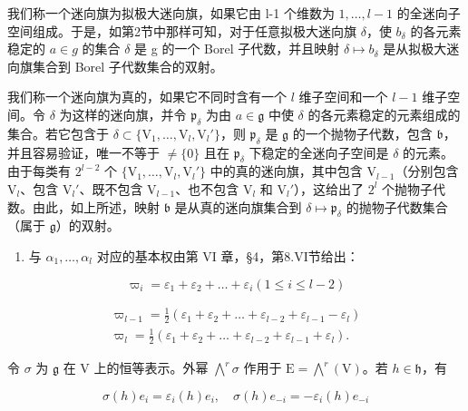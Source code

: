 我们称一个迷向旗为拟极大迷向旗，如果它由 l-1 个维数为 \(1,\ldots,l-1\) 的全迷向子空间组成。于是，如第2节中那样可知，对于任意拟极大迷向旗 \(\delta\)，使 \(b_{\delta}\) 的各元素稳定的 \(a\in g\) 的集合 \(\delta\) 是 g 的一个 Borel 子代数，并且映射 \(\delta\mapsto b_{\delta}\) 是从拟极大迷向旗集合到 Borel 子代数集合的双射。

我们称一个迷向旗为真的，如果它不同时含有一个 \(l\) 维子空间和一个 \(l-1\) 维子空间。令 \(\delta\) 为这样的迷向旗，并令 \(\mathfrak{p}_{\delta}\) 为由 \(a \in \mathfrak{g}\) 中使 \(\delta\) 的各元素稳定的元素组成的集合。若它包含于 \(\delta \subset \{\mathrm{V}_1, \ldots, \mathrm{V}_l, \mathrm{V}_l'\}\)，则 \(\mathfrak{p}_{\delta}\) 是 \(\mathfrak{g}\) 的一个抛物子代数，包含 \(\mathfrak{b}\)，并且容易验证，唯一不等于 \(\neq \{0\}\) 且在 \(\mathfrak{p}_{\delta}\) 下稳定的全迷向子空间是 \(\delta\) 的元素。由于每类有 \(2^{l-2}\) 个 \(\{\mathrm{V}_1, \ldots, \mathrm{V}_l, \mathrm{V}_l'\}\) 中的真的迷向旗，其中包含 \(\mathrm{V}_{l-1}\)（分别包含 \(\mathrm{V}_l\)、包含 \(\mathrm{V}_l'\)、既不包含 \(\mathrm{V}_{l-1}\)、也不包含 \(\mathrm{V}_l\) 和 \(\mathrm{V}_l'\)），这给出了 \(2^l\) 个抛物子代数。由此，如上所述，映射 \(\mathfrak{b}\) 是从真的迷向旗集合到 \(\delta \mapsto \mathfrak{p}_{\delta}\) 的抛物子代数集合（属于 \(\mathfrak{g}\)）的双射。

\begin{enumerate}
\def\labelenumi{(\Roman{enumi})}
\setcounter{enumi}{3}
\tightlist
\item
与 \(\alpha_{1},\ldots,\alpha_{l}\) 对应的基本权由第 VI 章，§4，第8.VI节给出：
\end{enumerate}

\[
\varpi_ {i} = \varepsilon_ {1} + \varepsilon_ {2} + \dots + \varepsilon_ {i} (1 \leq i \leq l - 2)
\]

\[
\begin{array}{c} \varpi_ {l - 1} = \frac {1}{2} (\varepsilon_ {1} + \varepsilon_ {2} + \ldots + \varepsilon_ {l - 2} + \varepsilon_ {l - 1} - \varepsilon_ {l}) \\ \varpi_ {l} = \frac {1}{2} (\varepsilon_ {1} + \varepsilon_ {2} + \ldots + \varepsilon_ {l - 2} + \varepsilon_ {l - 1} + \varepsilon_ {l}). \end{array}
\]

令 \(\sigma\) 为 \(\mathfrak{g}\) 在 V 上的恒等表示。外幂 \(\bigwedge^{r}\sigma\) 作用于 \(\mathrm{E} = \bigwedge^{r}(\mathrm{V})\)。若 \(h\in \mathfrak{h}\)，有

\[
\sigma (h) e _ {i} = \varepsilon_ {i} (h) e _ {i}, \quad \sigma (h) e _ {- i} = - \varepsilon_ {i} (h) e _ {- i}
\]

